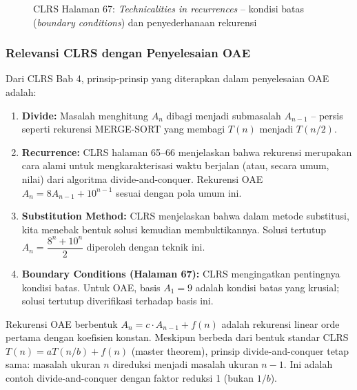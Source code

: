 \documentclass[12pt,a4paper]{article}
\theoremstyle{definition}
\begin{document}
\begin{figure}[H]
  \centering
  \caption{CLRS Halaman 67: \emph{Technicalities in recurrences} -- kondisi batas
           (\emph{boundary conditions}) dan penyederhanaan rekurensi}
\end{figure}

\subsubsection{Relevansi CLRS dengan Penyelesaian OAE}

Dari CLRS Bab 4, prinsip-prinsip yang diterapkan dalam penyelesaian OAE adalah:

\begin{enumerate}
  \item \textbf{Divide:} Masalah menghitung $A_n$ dibagi menjadi submasalah
        $A_{n-1}$ -- persis seperti rekurensi MERGE-SORT yang membagi $T(n)$
        menjadi $T(n/2)$.
  \item \textbf{Recurrence:} CLRS halaman 65--66 menjelaskan bahwa rekurensi
        merupakan cara alami untuk mengkarakterisasi waktu berjalan (atau, secara
        umum, nilai) dari algoritma divide-and-conquer. Rekurensi OAE
        $A_n = 8A_{n-1}+10^{n-1}$ sesuai dengan pola umum ini.
  \item \textbf{Substitution Method:} CLRS menjelaskan bahwa dalam metode
        substitusi, kita menebak bentuk solusi kemudian membuktikannya. Solusi
        tertutup $A_n = \dfrac{8^n+10^n}{2}$ diperoleh dengan teknik ini.
  \item \textbf{Boundary Conditions (Halaman 67):} CLRS mengingatkan pentingnya
        kondisi batas. Untuk OAE, basis $A_1=9$ adalah kondisi batas yang krusial;
        solusi tertutup diverifikasi terhadap basis ini.
\end{enumerate}

\begin{connectionbox}
  Rekurensi OAE berbentuk $A_n = c\cdot A_{n-1}+f(n)$ adalah rekurensi linear orde
  pertama dengan koefisien konstan. Meskipun berbeda dari bentuk standar CLRS
  $T(n) = aT(n/b)+f(n)$ (master theorem), prinsip divide-and-conquer tetap sama:
  masalah ukuran $n$ direduksi menjadi masalah ukuran $n-1$. Ini adalah contoh
  divide-and-conquer dengan faktor reduksi 1 (bukan $1/b$).
\end{connectionbox}
\end{document}
